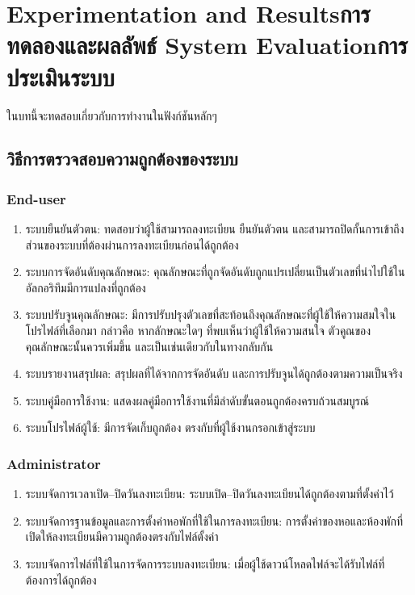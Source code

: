 \chapter{\ifproject%
\ifenglish Experimentation and Results\else การทดลองและผลลัพธ์\fi
\else%
\ifenglish System Evaluation\else การประเมินระบบ\fi
\fi}

ในบทนี้จะทดสอบเกี่ยวกับการทำงานในฟังก์ชันหลักๆ

\section{วิธีการตรวจสอบความถูกต้องของระบบ}
\subsection{End-user}
\begin{enumerate}
    \item ระบบยืนยันตัวตน: ทดสอบว่าผู้ใช้สามารถลงทะเบียน ยืนยันตัวตน และสามารถปิดกั้นการเข้าถึงส่วนของระบบที่ต้องผ่านการลงทะเบียนก่อนได้ถูกต้อง
    \item ระบบการจัดอันดับคุณลักษณะ: คุณลักษณะที่ถูกจัดอันดับถูกแปรเปลี่ยนเป็นตัวเลขที่นำไปใช้ในอัลกอริทึมมีการแปลงที่ถูกต้อง
    \item ระบบปรับจูนคุณลักษณะ: มีการปรับปรุงตัวเลขที่สะท้อนถึงคุณลักษณะที่ผู้ใช้ให้ความสมใจในโปรไฟล์ที่เลือกมา
            กล่าวคือ หากลักษณะใดๆ ที่พบเห็นว่าผู้ใช้ให้ความสนใจ ตัวคูณของคุณลักษณะนั้นควรเพิ่มขึ้น และเป็นเช่นเดียวกับในทางกลับกัน
    \item ระบบรายงานสรุปผล: สรุปผลที่ได้จากการจัดอันดับ และการปรับจูนได้ถูกต้องตามความเป็นจริง
    \item ระบบคู่มือการใช้งาน: แสดงผลคู่มือการใช้งานที่มีลำดับขั้นตอนถูกต้องครบถ้วนสมบูรณ์
    \item ระบบโปรไฟล์ผู้ใช้: มีการจัดเก็บถูกต้อง ตรงกับที่ผู้ใช้งานกรอกเข้าสู่ระบบ
\end{enumerate}

\subsection{Administrator}
\begin{enumerate}
    \item ระบบจัดการเวลาเปิด--ปิดวันลงทะเบียน: ระบบเปิด--ปิดวันลงทะเบียนได้ถูกต้องตามที่ตั้งค่าไว้
    \item ระบบจัดการฐานข้อมูลและการตั้งค่าหอพักที่ใช้ในการลงทะเบียน: การตั้งค่าของหอและห้องพักที่เปิดให้ลงทะเบียนมีความถูกต้องตรงกับไฟล์ตั้งค่า
    \item ระบบจัดการไฟล์ที่ใช้ในการจัดการระบบลงทะเบียน: เมื่อผู้ใช้ดาวน์โหลดไฟล์จะได้รับไฟล์ที่ต้องการได้ถูกต้อง
\end{enumerate}

